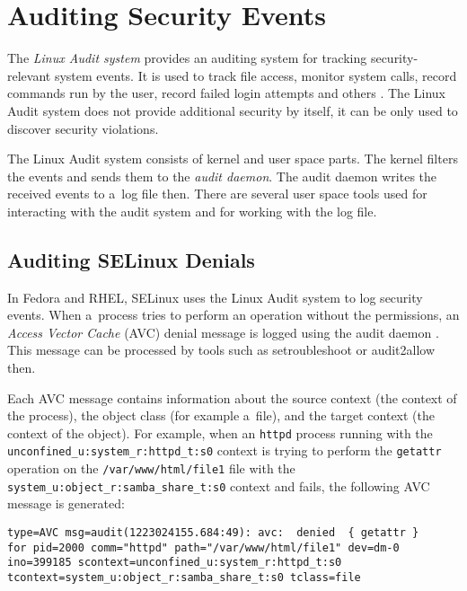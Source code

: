 \section{Auditing Security Events}

The \emph{Linux Audit system} provides an auditing system for tracking
security-relevant system events. It is used to track file access, monitor system
calls, record commands run by the user, record failed login attempts and others
\cite{secguide}. The Linux Audit system does not provide additional security by
itself, it can be only used to discover security violations.

The Linux Audit system consists of kernel and user space parts. The kernel
filters the events and sends them to the \emph{audit daemon}. The audit daemon
writes the received events to a~log file then. There are several user space
tools used for interacting with the audit system and for working with the log
file.

\subsection{Auditing SELinux Denials}

In Fedora and RHEL, SELinux uses the Linux Audit system to log security events.
When a~process tries to perform an operation without the permissions, an
\emph{Access Vector Cache} (AVC) denial message is logged using the audit daemon
\cite{selinuxguide}. This message can be processed by tools such as
setroubleshoot or audit2allow then.

Each AVC message contains information about the source context (the context of
the process), the object class (for example a~file), and the target context (the
context of the object). For example, when an \texttt{httpd} process running with
the \texttt{unconfined\_u:system\_r:httpd\_t:s0} context is trying to perform
the \texttt{getattr} operation on the \texttt{/var/www/html/file1} file with the
\texttt{system\_u:object\_r:samba\_share\_t:s0} context and fails, the following
AVC message is generated:

\begin{lstlisting}
type=AVC msg=audit(1223024155.684:49): avc:  denied  { getattr }
for pid=2000 comm="httpd" path="/var/www/html/file1" dev=dm-0
ino=399185 scontext=unconfined_u:system_r:httpd_t:s0
tcontext=system_u:object_r:samba_share_t:s0 tclass=file
\end{lstlisting}

